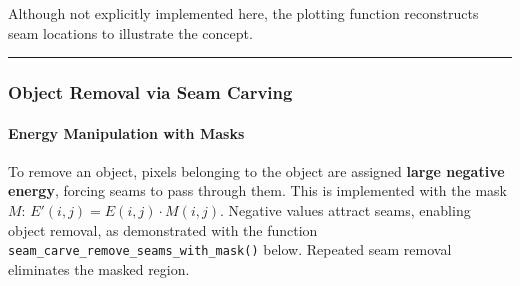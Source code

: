 \documentclass[11pt]{article}
\begin{document}
Although not explicitly implemented here, the plotting function
reconstructs seam locations to illustrate the concept.

\begin{center}\rule{0.5\linewidth}{0.5pt}\end{center}

\hypertarget{object-removal-via-seam-carving}{%
\subsubsection{\texorpdfstring{\textbf{Object Removal via Seam
Carving}}{Object Removal via Seam Carving}}\label{object-removal-via-seam-carving}}

\hypertarget{energy-manipulation-with-masks}{%
\paragraph{\texorpdfstring{\textbf{Energy Manipulation with
Masks}}{Energy Manipulation with Masks}}\label{energy-manipulation-with-masks}}

To remove an object, pixels belonging to the object are assigned
\textbf{large negative energy}, forcing seams to pass through them. This
is implemented with the mask \(M\): \(E'(i,j) = E(i,j) \cdot M(i,j)\).
Negative values attract seams, enabling object removal, as demonstrated
with the function \texttt{seam\_carve\_remove\_seams\_with\_mask()}
below. Repeated seam removal eliminates the masked region.
\end{document}
